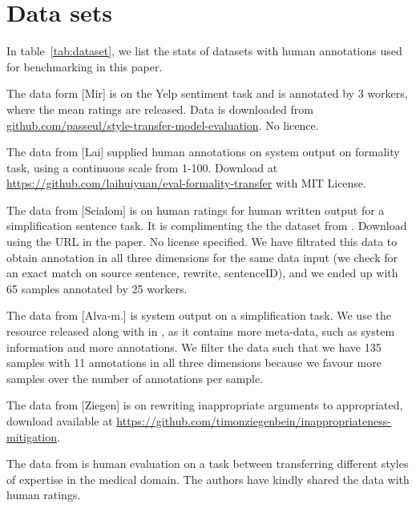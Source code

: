 \appendix
\section{Data sets}
\label{app:dataset}
In table~\ref{tab:dataset}, we list the stats of datasets with human annotations used for benchmarking in this paper. 

The data form \citet{mir-etal-2019-evaluating} [Mir] is on the Yelp sentiment task and is annotated by 3 workers, where the mean ratings are released. Data is downloaded from  \url{github.com/passeul/style-transfer-model-evaluation}. No licence.

The data from \citet{lai-etal-2022-human} [Lai] supplied human annotations on system output on formality task, using a continuous scale from 1-100. Download at \url{https://github.com/laihuiyuan/eval-formality-transfer} with MIT License. 

The data from \citet{scialom2021rethinking} [Scialom] is on human ratings for human written output for a simplification sentence task. It is complimenting the the dataset from  \citet{alva-manchego-etal-2020-asset}. Download using the URL in the paper. No license specified. We have filtrated this data to obtain annotation in all three dimensions for the same data input (we check for an exact match on source sentence, rewrite, sentenceID), and we ended up with 65 samples annotated by 25 workers. 

The data from \citet{alva-manchego-etal-2020-asset} [Alva-m.] is system output on a simplification task. We use the resource released along with in \citet{scialom2021rethinking}, as it contains more meta-data, such as system information and more annotations. We filter the data such that we have 135 samples with 11 annotations in all three dimensions because we favour more samples over the number of annotations per sample. 

The data from \citet{ziegenbein-etal-2024-llm} [Ziegen] is on rewriting inappropriate arguments to appropriated, download available at \url{https://github.com/timonziegenbein/inappropriateness-mitigation}.

The data from \citet{cao-etal-2020-expertise} is human evaluation on a task between transferring different styles of expertise in the medical domain. The authors have kindly shared the data with human ratings. 

